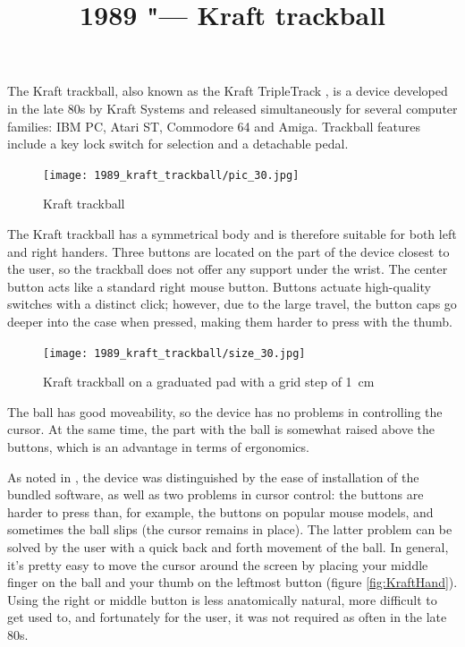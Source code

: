 \documentclass[11pt, a4paper]{article}
\begin{document}
\title{1989 "--- Kraft trackball}
\date{}
\maketitle
{}
The Kraft trackball, also known as the Kraft TripleTrack \cite{triple}, is a device developed in the late 80s by Kraft Systems and released simultaneously for several computer families: IBM PC, Atari ST, Commodore 64 and Amiga. Trackball features include a key lock switch for selection and a detachable pedal.

\begin{figure}[h]
    \centering
    \texttt{[image: 1989\_kraft\_trackball/pic\_30.jpg]}
    \caption{Kraft trackball}
    \label{fig:KraftPhoto}
\end{figure}

The Kraft trackball has a symmetrical body and is therefore suitable for both left and right handers. Three buttons are located on the part of the device closest to the user, so the trackball does not offer any support under the wrist. The center button acts like a standard right mouse button. Buttons actuate high-quality switches with a distinct click; however, due to the large travel, the button caps go deeper into the case when pressed, making them harder to press with the thumb.

\begin{figure}[h]
    \centering
    \texttt{[image: 1989\_kraft\_trackball/size\_30.jpg]}
    \caption{Kraft trackball on a graduated pad with a grid step of 1~cm}
    \label{fig:KraftSize}
\end{figure}

The ball has good moveability, so the device has no problems in controlling the cursor. At the same time, the part with the ball is somewhat raised above the buttons, which is an advantage in terms of ergonomics.

As noted in \cite{Hudnall}, the device was distinguished by the ease of installation of the bundled software, as well as two problems in cursor control: the buttons are harder to press than, for example, the buttons on popular mouse models, and sometimes the ball slips (the cursor remains in place). The latter problem can be solved by the user with a quick back and forth movement of the ball. In general, it's pretty easy to move the cursor around the screen by placing your middle finger on the ball and your thumb on the leftmost button (figure \ref{fig:KraftHand}). Using the right or middle button is less anatomically natural, more difficult to get used to, and fortunately for the user, it was not required as often in the late 80s.
\end{document}
